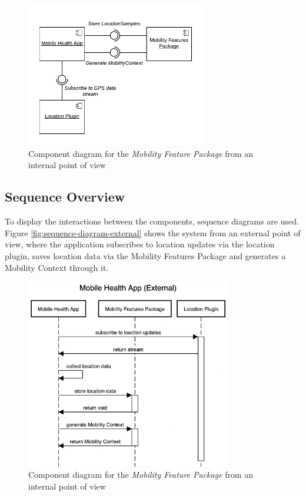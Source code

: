 \begin{figure}[h]
\centering
\includegraphics[width=0.7\textwidth]{images/diagrams/component-external.pdf}
\caption{Component diagram for the \textit{Mobility Feature Package} from an internal point of view}
\label{fig:component-diagram-external}
\end{figure}


\subsection{Sequence Overview}
To display the interactions between the components, sequence diagrams are used. Figure \ref{fig:sequence-diagram-external} shows the system from an external point of view, where the application subscribes to location updates via the location plugin, saves location data via the Mobility Features Package and generates a Mobility Context through it. 

\begin{figure}[h]
\centering
\includegraphics[width=0.8\textwidth]{images/diagrams/sequence-external.png}
\caption{Component diagram for the \textit{Mobility Feature Package} from an internal point of view}
\label{fig:sequence-diagram-internal}
\end{figure}

